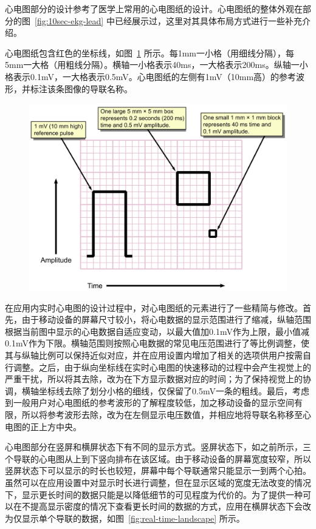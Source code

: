心电图部分的设计参考了医学上常用的心电图纸的设计。心电图纸的整体外观在部分的图~\ref{fig:10sec-ekg-lead} 中已经展示过，这里对其具体布局方式进行一些补充介绍。

心电图纸包含红色的坐标线，如图~\ref{fig:ecg-paper} 所示。每1mm一小格（用细线分隔），每5mm一大格（用粗线分隔）。横轴一小格表示40ms，一大格表示200ms。纵轴一小格表示0.1mV，一大格表示0.5mV。心电图纸的左侧有1mV（10mm高）的参考波形，并标注该条图像的导联名称。

\begin{figure}[ht]
    \includegraphics[width=\textwidth]{../assets/ECG_Paper_v2}
    \label{fig:ecg-paper}
\end{figure}

在应用内实时心电图的设计过程中，对心电图纸的元素进行了一些精简与修改。首先，由于移动设备的屏幕尺寸较小，将心电数据的显示范围进行了缩减，纵轴范围根据当前图中显示的心电数据自适应变动，以最大值加0.1mV作为上限，最小值减0.1mV作为下限。横轴范围则按照心电数据的常见电压范围进行了等比例调整，使其与纵轴比例可以保持近似对应，并在应用设置内增加了相关的选项供用户按需自行调整。之后，由于纵向坐标线在实时心电图的快速移动的过程中会产生视觉上的严重干扰，所以将其去除，改为在下方显示数据对应的时间；为了保持视觉上的协调，横轴坐标线去除了划分小格的细线，仅保留了0.5mV一条的粗线。最后，考虑到一般用户对心电图纸的参考波形的了解程度较低，加之移动设备的显示空间有限，所以将参考波形去除，改为在左侧显示电压数值，并相应地将导联名称移至心电图的正上方中央。

心电图部分在竖屏和横屏状态下有不同的显示方式。竖屏状态下，如之前所示，三个导联的心电图从上到下竖向排布在该区域。由于移动设备的屏幕宽度较窄，所以竖屏状态下可以显示的时长也较短，屏幕中每个导联通常只能显示一到两个心拍。虽然可以在应用设置中对显示时长进行调整，但在显示区域的宽度无法改变的情况下，显示更长时间的数据只能是以降低细节的可见程度为代价的。为了提供一种可以在不提高显示密度的情况下查看更长时间的数据的方式，应用在横屏状态下会改为仅显示单个导联的数据，如图~\ref{fig:real-time-landscape} 所示。

